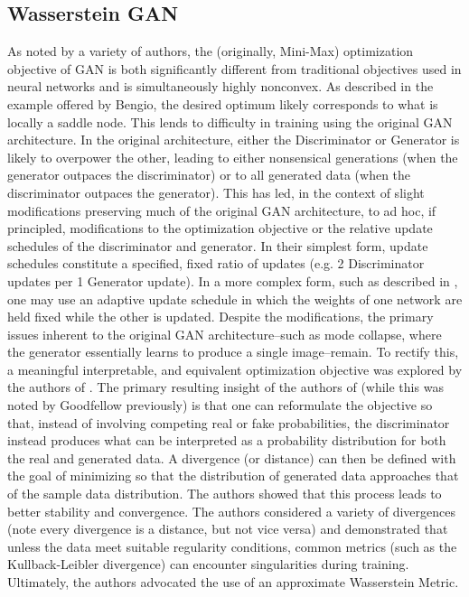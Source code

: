 \documentclass{article}
\begin{document}
\subsection{Wasserstein GAN }\label{wgan}
	As noted by a variety of authors, the (originally, Mini-Max) optimization objective of GAN is both significantly different from traditional objectives used in neural networks and is simultaneously highly nonconvex.   As described in the example offered by Bengio, the desired optimum likely corresponds to what is locally a saddle node.  This lends to difficulty in training using the original GAN architecture.  In the original architecture, either the Discriminator or Generator is likely to overpower the other, leading to either nonsensical generations (when the generator outpaces the discriminator) or to all generated data (when the discriminator outpaces the generator).  This has led, in the context of slight modifications preserving much of the original GAN architecture, to ad hoc, if principled, modifications to the optimization objective or the relative update schedules of the discriminator and generator.
\newline
	In their simplest form, update schedules constitute a specified, fixed ratio of updates (e.g. 2 Discriminator updates per 1 Generator update).  In a more complex form, such as described in \cite{Radford2015UnsupervisedNetworks}, one may use an adaptive update schedule in which the weights of one network are held fixed while the other is updated.  
    Despite the modifications, the primary issues inherent to the original GAN architecture--such as mode collapse, where the generator essentially learns to produce a single image--remain.  To rectify this, a meaningful interpretable, and equivalent optimization objective was explored by the authors of \cite{Arjovsky2017WassersteinGAN}.  The primary resulting insight of the authors of \cite{Arjovsky2017WassersteinGAN} (while this was noted by Goodfellow previously) is that one can reformulate the objective so that, instead of involving competing real or fake probabilities, the discriminator instead produces what can be interpreted as a probability distribution for both the real and generated data.  A divergence (or distance) can then be defined with the goal of minimizing so that the distribution of generated data approaches that of the sample data distribution.  The authors showed that this process leads to better stability and convergence.
\newline
	The authors considered a variety of divergences (note every divergence is a distance, but not vice versa) and demonstrated that unless the data meet suitable regularity conditions, common metrics (such as the Kullback-Leibler divergence) can encounter singularities during training. Ultimately, the authors advocated the use of an approximate Wasserstein Metric.
\end{document}

